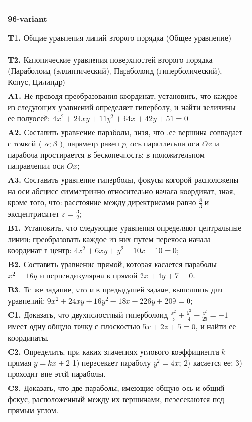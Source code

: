 \documentclass{article}
\begin{document}
\begin{tabular}{m{17cm}}
\textbf{96-variant}
\newline

\textbf{T1.} Общие уравнения линий второго порядка (Общее уравнение) \\
\textbf{T2.} Канонические уравнения поверхностей второго порядка (Параболоид (эллиптический), Параболоид (гиперболический), Конус, Цилиндр) \\
\textbf{A1.} Не проводя преобразования координат, установить, что каждое из следующих уравнений определяет гиперболу, и найти величины ее полуосей: $4 x^2+24 x y+11 y^2+64 x+42 y+51=0$; \\
\textbf{A2.} Составить уравнение параболы, зная, что .ее вершина совпадает с точкой ( $\alpha ; \beta$ ), параметр равен $p$, ось параллельна оси $O x$ и парабола простирается в бесконечность: в положительном направлении оси $O x$; \\
\textbf{A3.} Составить уравнение гиперболы, фокусы когорой расположены на оси абсцисс симметрично относительно начала координат, зная, кроме того, что: расстояние между директрисами равно $\frac{8}{3}$ и эксцентриситет $\varepsilon=\frac{3}{2}$; \\
\textbf{B1.} Установить, что следующие уравнения определяют центральные линии; преобразовать каждое из них путем переноса начала координат в центр: $4 x^2+6 x y+y^2-10 x-10=0$; \\
\textbf{B2.} Составить уравнение прямой, которая касается параболы $x^2=16 y$ и перпендикулярна к прямой $2 x+4 y+7=0$. \\
\textbf{B3.} То же задание, что и в предыдушей задаче, выполнить для уравнений: $9 x^2+24 x y+16 y^2-18 x+226 y+209=0$; \\
\textbf{C1.} Доказать, что двухполостный гиперболоид $\frac{x^2}{3}+\frac{y^2}{4}-\frac{z^2}{25}=-1$ имеет одну общую точку с плоскостью $5 x+2 z+5=0$, и найти ее координаты. \\
\textbf{C2.} Определить, при каких значениях углового коэффициента $k$ прямая $y=k x+2$ 1) пересекает параболу $y^2=4 x$; 2) касается ее; 3) проходит вне этсй параболы. \\
\textbf{C3.} Доказать, что две параболы, имеющие общую ось и общий фокус, расположенный между их вершинами, пересекаются под прямым углом. \\

\end{tabular}
\vspace{1cm}
\end{document}
